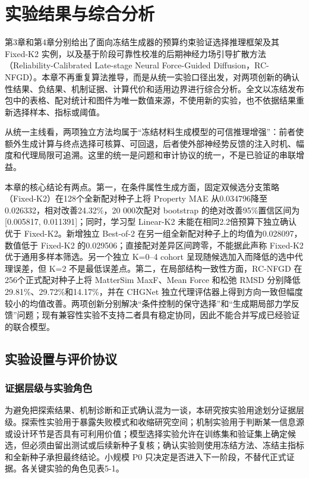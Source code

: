 \chapter{实验结果与综合分析}

第3章和第4章分别给出了面向冻结生成器的预算约束验证选择推理框架及其 Fixed-K2 实例，以及基于阶段可靠性校准的后期神经力场引导扩散方法（Reliability-Calibrated Late-stage Neural Force-Guided Diffusion，RC-NFGD）。本章不再重复算法推导，而是从统一实验口径出发，对两项创新的确认性结果、负结果、机制证据、计算代价和适用边界进行综合分析。全文以冻结发布包中的表格、配对统计和图件为唯一数值来源，不使用新的实验，也不依据结果重新选择样本、指标或阈值。

从统一主线看，两项独立方法均属于“冻结材料生成模型的可信推理增强”：前者使额外生成计算与终点选择可核算、可回退，后者使外部神经势反馈的注入时机、幅度和代理局限可追溯。这里的统一是问题和审计协议的统一，不是已验证的串联增益。


本章的核心结论有两点。第一，在条件属性生成方面，固定双候选分支策略（Fixed-K2）在128个全新配对种子上将 Property MAE 从0.034796降至0.026332，相对改善24.32\%，20 000次配对 bootstrap 的绝对改善95\%置信区间为{[}0.005817, 0.011391{]}；同时，学习型 Linear-K2 未能在相同2.2倍预算下独立确认优于 Fixed-K2。新增独立 Best-of-2 在另一组全新配对种子上的均值为0.028097，数值低于 Fixed-K2 的0.029506；直接配对差异区间跨零，不能据此声称 Fixed-K2 优于通用多样本筛选。另一个独立 K=0--4 cohort 呈现随候选加入而降低的选中代理误差，但 K=2 不是最低误差点。第二，在局部结构一致性方面，RC-NFGD 在256个正式配对种子上将 Matter\allowbreak Sim MaxF、Mean Force 和松弛 RMSD 分别降低29.81\%、29.72\%和14.17\%，并在 CHGNet 独立代理评估器上得到方向一致但幅度较小的均值改善。两项创新分别解决``条件控制的保守选择''和``生成期局部力学反馈''问题；现有兼容性实验不支持二者具有稳定协同，因此不能合并写成已经验证的联合模型。

\section{实验设置与评价协议}

\subsection{证据层级与实验角色}

为避免把探索结果、机制诊断和正式确认混为一谈，本研究按实验用途划分证据层级。探索性实验用于暴露失败模式和收缩研究空间；机制实验用于判断某一信息源或设计环节是否具有可利用价值；模型选择实验允许在训练集和验证集上确定候选，但必须由留出测试或后续新种子复核；确认实验则使用冻结方法、冻结主指标和全新种子承担最终结论。小规模 P0 只决定是否进入下一阶段，不替代正式证据。各关键实验的角色见表5-1。


